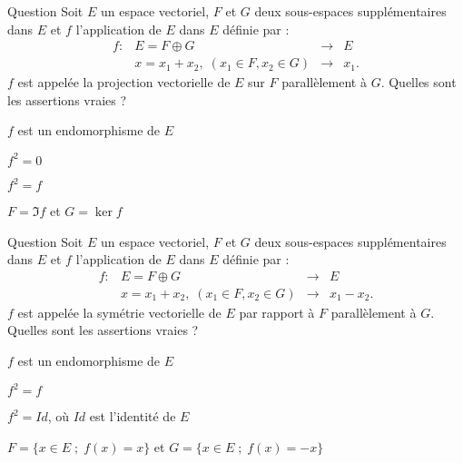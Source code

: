 \begin{multi}[multiple,feedback=
{On vérifie que \(f\) est un endomorphisme, \(f^2=f\), \(\ker f=G\) et \(\Im f=F\).
}]{Question}
Soit \(E\) un espace vectoriel, \(F\) et \(G\) deux sous-espaces supplémentaires dans \(E\) et \(f\) l'application de \(E\) dans \(E\) définie par : \[\begin{array}{rccc}f:&E=F\oplus G&\to&E\\
& x=x_1+x_2, \; (x_1\in F, x_2 \in G)&\to &x_1.  \end{array}\] 
\(f\) est appelée la projection vectorielle de \(E\) sur \(F\) parallèlement à \(G\). Quelles sont les assertions vraies ?

    \item* \(f\) est un endomorphisme de \(E\)
    \item \(f^2=0\)
    \item* \(f^2=f\)
    \item* \(F=\Im f\) et \(G=\ker f\)
\end{multi}


\begin{multi}[multiple,feedback=
{On vérifie que \(f\) est un endomorphisme, \(f^2=Id\), \(F=\{x\in E \; ; \; f(x)=x\}\) et \(G=\{x\in E \; ; \; f(x)=-x\}\).
}]{Question}
Soit \(E\) un espace vectoriel, \(F\) et \(G\) deux sous-espaces supplémentaires dans \(E\) et \(f\) l'application de \(E\) dans \(E\) définie par : \[\begin{array}{rccc}f:&E=F\oplus G&\to&E\\
& x=x_1+x_2, \; (x_1\in F, x_2 \in G)&\to &x_1-x_2.  \end{array}\] 
\(f\) est appelée la symétrie vectorielle de \(E\) par rapport à \(F\) parallèlement à \(G\). Quelles sont les assertions vraies ?

    \item* \(f\) est un endomorphisme de \(E\)
    \item \(f^2=f\)
    \item* \(f^2=Id\), où \(Id\) est l'identité de \(E\)
    \item* \(F=\{x\in E\; ;\; f(x)=x\}\) et \(G=\{x\in E\; ;\; f(x)=-x\}\)
\end{multi}



